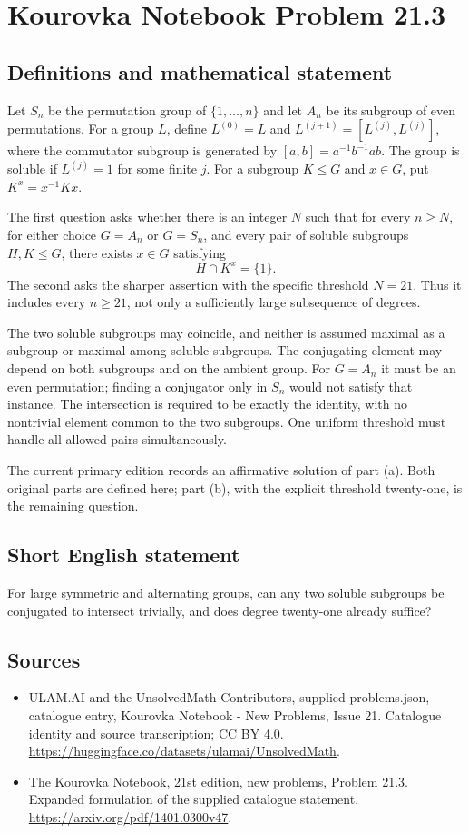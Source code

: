 \documentclass[11pt,a4paper]{article}
\begin{document}
\section*{Kourovka Notebook Problem 21.3}\label{statement}

\subsection{Definitions and mathematical statement}
Let $S_n$ be the permutation group of $\{1,\ldots,n\}$ and let $A_n$
be its subgroup of even permutations. For a group $L$, define
$L^{(0)}=L$ and $L^{(j+1)}=[L^{(j)},L^{(j)}]$, where the commutator
subgroup is generated by $[a,b]=a^{-1}b^{-1}ab$. The group is soluble
if $L^{(j)}=1$ for some finite $j$.
For a subgroup $K\le G$ and $x\in G$, put $K^x=x^{-1}Kx$.

The first question asks whether there is an integer $N$ such that for
every $n\ge N$, for either choice $G=A_n$ or $G=S_n$, and every pair
of soluble subgroups $H,K\le G$, there exists $x\in G$ satisfying
\[
 H\cap K^x=\{1\}.
\]
The second asks the sharper assertion with the specific threshold
$N=21$. Thus it includes every $n\ge21$, not only a sufficiently large
subsequence of degrees.

The two soluble subgroups may coincide, and neither is assumed maximal
as a subgroup or maximal among soluble subgroups. The conjugating element
may depend on both subgroups and on the ambient group. For $G=A_n$ it
must be an even permutation; finding a conjugator only in $S_n$ would
not satisfy that instance. The intersection is required to be exactly
the identity, with no nontrivial element common to the two subgroups.
One uniform threshold must handle all allowed pairs simultaneously.

The current primary edition records an affirmative solution of part (a).
Both original parts are defined here; part (b), with the explicit
threshold twenty-one, is the remaining question.
\subsection{Short English statement}
For large symmetric and alternating groups, can any two soluble subgroups be conjugated to intersect trivially, and does degree twenty-one already suffice?
\subsection{Sources}
\begin{itemize}
\item[S1] ULAM.AI and the UnsolvedMath Contributors, supplied problems.json, catalogue entry, Kourovka Notebook - New Problems, Issue 21. Catalogue identity and source transcription; CC BY 4.0.
\url{https://huggingface.co/datasets/ulamai/UnsolvedMath}.
\item[S2] The Kourovka Notebook, 21st edition, new problems, Problem 21.3. Expanded formulation of the supplied catalogue statement.
\url{https://arxiv.org/pdf/1401.0300v47}.
\end{itemize}
\end{document}
